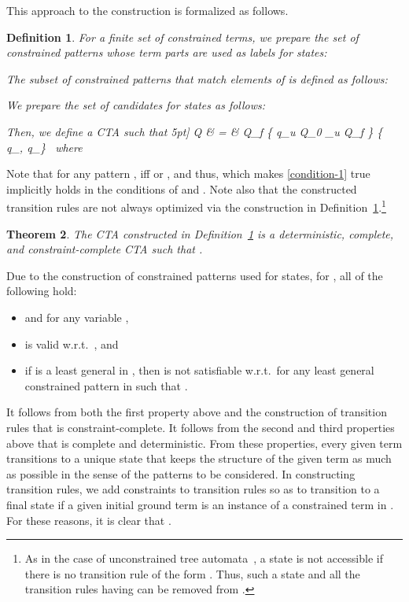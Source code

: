 \documentclass[copyright,creativecommons]{eptcs}
\newcommand{\eop}{\hspace*{\fill}}
\newtheorem{definition}{Definition}
\newtheorem{theorem}[definition]{Theorem}
{\theorembodyfont{\rmfamily}
  \newtheorem{example}[definition]{\it Example}
  \newtheorem{myproof}{\it Proof.}
}
\newenvironment{proof}{\begin{myproof}}{\eop\end{myproof}}
\begin{document}
This approach to the construction is formalized as follows.
\begin{definition}
 \label{def:G(T)}
 For a finite set  of constrained terms, 
 we prepare the set  of constrained patterns whose term parts
 are used as labels for states:
 
 The subset  of constrained patterns that match
 elements of  
 is defined as follows:
 
We prepare the set  of candidates for states as follows:

 Then, we define a CTA    such that
5pt]
  Q & = & 
  Q_f 
  \cup
  \{ q_u \in Q_0 \mid {}_u \not\in Q_f \}
  \cup 
  \{ q_\square, q_\blacksquare\}
  \
where

\end{definition}
Note that for any pattern   , 
   iff    or   , and
thus,    which makes \ref{condition-1} true implicitly
holds in the conditions of  and
.
Note also that the constructed transition rules are not always
optimized via the construction in Definition~\ref{def:G(T)}.\footnote{ As in the case of unconstrained tree automata~\cite{TATA}, 
a state  is not accessible if there is no transition rule of the
form .
Thus, such a state  and all the transition rules having  can be
removed from .}
\begin{theorem}
 \label{th:correctness}
The CTA  constructed in Definition~\ref{def:G(T)} is a
 deterministic, complete, and constraint-complete CTA such that 
  .
\end{theorem}
\begin{proof}
Due to the construction of constrained patterns used for states, 
for   , 
all of the following hold:
\begin{itemize}
 \item    and   
       for any variable   , 
 \item  is
       valid w.r.t.\ , and
 \item if  is a least general in , then
        is not satisfiable w.r.t.\  for any
       least general constrained pattern  in 
       such that   .
 \end{itemize}
It follows from both the first property above and the construction of
 transition rules that  is constraint-complete.  
It follows from the second and third properties above that  is
 complete and deterministic. 
From these properties, every given term transitions to a unique state
 that keeps the structure of the given term as much as possible in the
 sense of the patterns to be considered. 
 In constructing transition rules, we add constraints to transition
 rules so as to transition to a final state if a given initial ground
 term is an instance of a constrained term in . 
 For these reasons, it is clear that   .
\end{proof}
\end{document}
